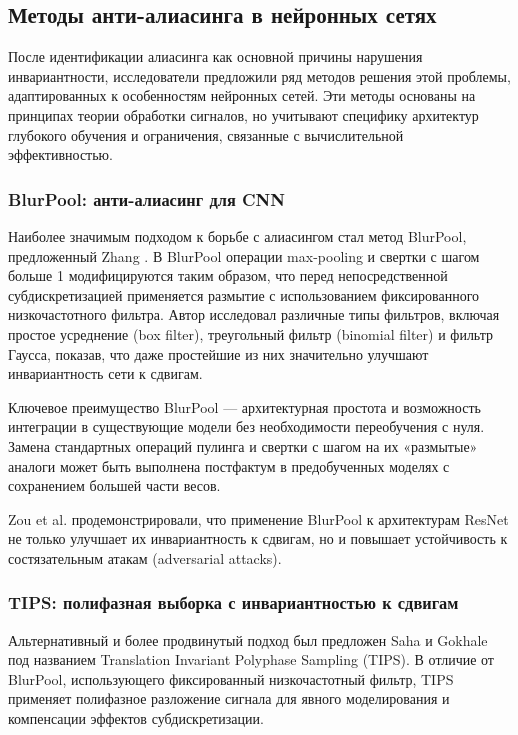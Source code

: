 \subsection{Методы анти-алиасинга в нейронных сетях}
\label{review:antialias}

После идентификации алиасинга как основной причины нарушения инвариантности, исследователи предложили ряд методов решения этой проблемы, адаптированных к особенностям нейронных сетей. Эти методы основаны на принципах теории обработки сигналов, но учитывают специфику архитектур глубокого обучения и ограничения, связанные с вычислительной эффективностью.

\subsubsection{BlurPool: анти-алиасинг для CNN}
\label{review:antialias:blurpool}

Наиболее значимым подходом к борьбе с алиасингом стал метод BlurPool, предложенный Zhang \cite{Zhang2019blurpool}. В BlurPool операции max-pooling и свертки с шагом больше 1 модифицируются таким образом, что перед непосредственной субдискретизацией применяется размытие с использованием фиксированного низкочастотного фильтра. Автор исследовал различные типы фильтров, включая простое усреднение (box filter), треугольный фильтр (binomial filter) и фильтр Гаусса, показав, что даже простейшие из них значительно улучшают инвариантность сети к сдвигам.

Ключевое преимущество BlurPool — архитектурная простота и возможность интеграции в существующие модели без необходимости переобучения с нуля. Замена стандартных операций пулинга и свертки с шагом на их «размытые» аналоги может быть выполнена постфактум в предобученных моделях с сохранением большей части весов.

Zou et al. \cite{zou2020delving} продемонстрировали, что применение BlurPool к архитектурам ResNet не только улучшает их инвариантность к сдвигам, но и повышает устойчивость к состязательным атакам (adversarial attacks).

\subsubsection{TIPS: полифазная выборка с инвариантностью к сдвигам}
\label{review:antialias:tips}

Альтернативный и более продвинутый подход был предложен Saha и Gokhale \cite{saha2024tips} под названием Translation Invariant Polyphase Sampling (TIPS). В отличие от BlurPool, использующего фиксированный низкочастотный фильтр, TIPS применяет полифазное разложение сигнала для явного моделирования и компенсации эффектов субдискретизации.

